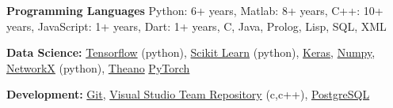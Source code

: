\textbf{Programming Languages}
Python: 6+ years, Matlab: 8+ years, C++: 10+ years, JavaScript: 1+ years, Dart: 1+ years, C, Java, Prolog, Lisp, SQL, XML



\textbf{Data Science:} \href{https://www.tensorflow.org/}{Tensorflow}
(python), \href{http://scikit-learn.org}{Scikit Learn} (python),
\href{https://keras.io/}{Keras},
\href{http://www.numpy.org/}{Numpy},
\href{https://networkx.github.io/}{NetworkX} (python),
\href{http://deeplearning.net/software/theano/}{Theano}
\href{https://pytorch.org/}{PyTorch}


\textbf{Development:} \href{https://git-scm.com/}{Git}, \href{https://app.vsaex.visualstudio.com/me?mkt=en-US&campaign=o~msft~vsts~usercard}{Visual Studio Team Repository} (c,c++), \href{https://www.postgresql.org/}{PostgreSQL}


